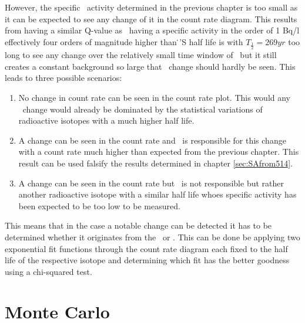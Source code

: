 However, the specific \Kr\ activity determined in the previous chapter is too small as it can be expected to see any change of it in the count rate diagram.
This results from  having a similar Q-value as \Kr\ having a specific activity in the order of 1 Bq/l effectively four orders of magnitude higher than \Kr\.
'S half life is with $T_{\frac{1}{2}} = 269\unit{yr}$ too long to see any change over the relatively small time window of \PII\ but it still creates a constant background so large that \Kr\ change should hardly be seen.
This leads to three possible scenarios:
\begin{enumerate}
	\item No change in count rate can be seen in the count rate plot. 
	This would any \Kr\ change would already be dominated by the statistical variations of radioactive isotopes with a much higher half life.
	\item A change can be seen in the count rate and \Kr\ is responsible for this change with a count rate much higher than expected from the previous chapter.
	This result can be used falsify the results determined in chapter \ref{sec:SAfrom514}.
	\item A change can be seen in the count rate but \Kr\ is not responsible but rather another radioactive isotope with a similar half life whoes specific activity has been expected to be too low to be measured.
	
\end{enumerate}
This means that in the case a notable change can be detected it has to be determined whether it originates from the \Kr\ or .
This can be done be applying two exponential fit functions through the count rate diagram each fixed to the half life of the respective isotope and determining which fit has the better goodness using a chi-squared test.
\\

\section{Monte Carlo}

